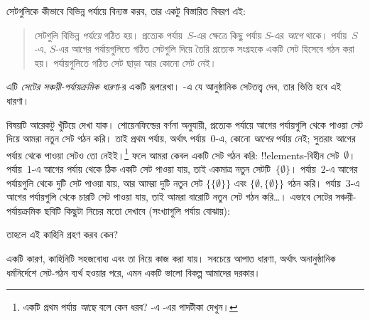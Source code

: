 \documentclass[../../../include/open-logic-section]{subfiles}
\begin{document}

সেটগুলিকে কীভাবে বিভিন্ন পর্যায়ে বিন্যস্ত করব, তার একটু
বিস্তারিত বিবরণ এই:
\begin{quote}
  সেটগুলি বিভিন্ন \emph{পর্যায়ে} গঠিত হয়। প্রত্যেক পর্যায়~$S$-এর
  ক্ষেত্রে কিছু পর্যায় $S$-এর \emph{আগে} থাকে। পর্যায়~$S$-এ, $S$-এর আগের
  পর্যায়গুলিতে গঠিত সেটগুলি দিয়ে তৈরি প্রত্যেক সংগ্রহকে একটি
  সেট হিসেবে গঠন করা হয়। পর্যায়গুলিতে গঠিত সেট ছাড়া আর
  কোনো সেট নেই। \citep[p.~323]{Shoenfield:AST}
\end{quote}
এটি \emph{সেটের সঞ্চয়ী-পর্যায়ক্রমিক ধারণা}-র একটি রূপরেখা।
-এ যে আনুষ্ঠানিক সেটতত্ত্ব দেব, তার
ভিত্তি হবে এই ধারণা।

বিষয়টি আরেকটু খুঁটিয়ে দেখা যাক। শোয়েনফিল্ডের বর্ণনা
অনুযায়ী, প্রত্যেক পর্যায়ে আগের পর্যায়গুলি থেকে পাওয়া
সেট দিয়ে আমরা নতুন সেট গঠন করি। তাই প্রথম পর্যায়, অর্থাৎ
পর্যায়~$0$-এ, কোনো \emph{আগের} পর্যায় নেই; সুতরাং আগের
পর্যায় থেকে পাওয়া সেটও তো নেইই।\footnote{একটি প্রথম পর্যায়
\emph{আছে} বলে কেন ধরব? -এ
\stagesord{}-এর পাদটীকা দেখুন।} ফলে আমরা কেবল একটি সেট
গঠন করি: !!{element}s-বিহীন সেট~$\emptyset$। পর্যায়~$1$-এ
আগের পর্যায় থেকে ঠিক একটি সেট পাওয়া যায়, তাই একমাত্র নতুন
সেটটি~$\{\emptyset\}$। পর্যায়~$2$-এ আগের পর্যায়গুলি থেকে
দুটি সেট পাওয়া যায়, আর আমরা দুটি নতুন সেট
$\{\{\emptyset\}\}$ এবং $\{\emptyset, \{\emptyset\}\}$
গঠন করি। পর্যায়~$3$-এ আগের পর্যায়গুলি থেকে চারটি সেট
পাওয়া যায়, তাই আমরা বারোটি নতুন সেট গঠন করি\ldots।
এভাবে সেটের সঞ্চয়ী-পর্যায়ক্রমিক ছবিটি কিছুটা নিচের মতো
দেখাবে (সংখ্যাগুলি পর্যায় বোঝায়):
\begin{center}
\end{center}
তাহলে এই কাহিনি গ্রহণ করব কেন?

একটি কারণ, কাহিনিটি সহজবোধ্য এবং তা নিয়ে কাজ করা যায়।
সবচেয়ে আপাত ধারণা, অর্থাৎ অনানুষ্ঠানিক ধর্মনির্দেশে
সেট-গঠন ব্যর্থ হওয়ার পরে, এমন একটি ভালো বিকল্প আমাদের দরকার।
\end{document}
